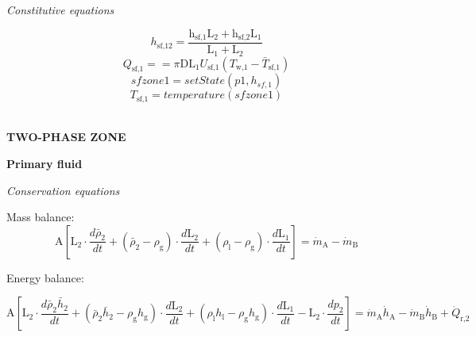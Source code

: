 \documentclass[11pt]{article} %
\begin{document}
\begin{center}
\textit{Constitutive equations}\\
\end{center}
\begin{equation}
h_\text{sf,12} = \frac{   \text{h}_\text{sf,1} \text{L}_\text{2}  + \text{h}_\text{sf,2}\text{L}_\text{1}      }{  \text{L}_\text{1} + \text{L}_\text{2}         } 
\end{equation}
\begin{equation}
{Q}_\text{sf,1} = = \pi \text{D} \text{L}_\text{1} U_\text{sf,1} (T_\text{w,1} - \bar{T}_\text{sf,1})
\end{equation}
\begin{equation}
sfzone1 = setState(p1,h_{sf,1})
\end{equation}
\begin{equation}
T_\text{sf,1} = temperature(sfzone1)
\end{equation}\\



\begin{center}
{\bf TWO-PHASE ZONE}
\end{center}
{\bf Primary fluid}\\
\begin{center}
\textit{Conservation equations}\\
\end{center}
Mass balance:\\
\begin{equation}
\text{A}[\text{L}_\text{2}  \cdot \frac{d \bar{\rho}_\text{2}}{d t} + (\bar{\rho}_\text{2} - \rho_\text{g}) \cdot \frac{d \text{L}_\text{2}}{d t} + (\rho_\text{l} - \rho_\text{g}) \cdot \frac{d \text{L}_\text{1}}{d t}] =  \dot{m}_\text{A} -  \dot{m}_\text{B}
\end{equation}

\begin{flushleft}
Energy balance:\\
\end{flushleft}
\begin{equation}
\text{A}[\text{L}_\text{2} \cdot  \frac{d \bar{\rho}_\text{2} \bar{h}_\text{2}}{d t} +  (\bar{\rho}_\text{2}\bar{h}_\text{2} - \rho_\text{g}h_\text{g}) \cdot \frac{d \text{L}_\text{2}}{d t}  +  (\rho_\text{l}h_\text{l} - \rho_\text{g}h_\text{g}) \cdot \frac{d \text{L}_\text{1}}{d t}       -   \text{L}_\text{2} \cdot  \frac{d p_\text{2}}{d t} ] =  \dot{m}_\text{A}  \dot{h}_\text{A} -  \dot{m}_\text{B} \dot{h}_\text{B} + \dot{Q}_\text{r,2}
\end{equation}
\end{document}
